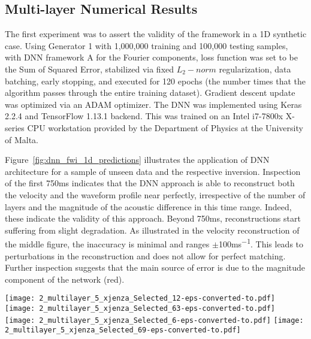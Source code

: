 \clearpage
\subsection{Multi-layer Numerical Results}\label{sec:results_Multi-layer_1D_Numerical_Results}
The first experiment was to assert the validity of the framework in a 1D synthetic case. Using Generator 1 with 1,000,000 training and 100,000 testing samples, with DNN framework A for the Fourier components, loss function was set to be the Sum of Squared Error, stabilized via fixed $L_2-norm$ regularization, data batching, early stopping, and executed for 120 epochs (the number times that the algorithm passes through the entire training dataset). Gradient descent update was optimized via an ADAM optimizer. The DNN was implemented using Keras 2.2.4 and TensorFlow 1.13.1 backend. This was trained on an Intel i7-7800x X-series CPU workstation provided by the Department of Physics at the University of Malta.

Figure~\ref{fig:dnn_fwi_1d_predictions} illustrates the application of DNN architecture for a sample of unseen data and the respective inversion. Inspection of the first 750\si{ms} indicates that the DNN approach is able to reconstruct both the velocity and the waveform profile near perfectly, irrespective of the number of layers and the magnitude of the acoustic difference in this time range. Indeed, these indicate the validity of this approach. Beyond 750\si{ms}, reconstructions start suffering from slight degradation. As illustrated in the velocity reconstruction of the middle figure, the inaccuracy is minimal and ranges $\pm$100\si{ms^{-1}}. This leads to perturbations in the reconstruction and does not allow for perfect matching. Further inspection suggests that the main source of error is due to the magnitude component of the network (red). 

\begin{figure*}[ht!]
	\centering
	\texttt{[image: 2\_multilayer\_5\_xjenza\_Selected\_12-eps-converted-to.pdf]}
	\texttt{[image: 2\_multilayer\_5\_xjenza\_Selected\_63-eps-converted-to.pdf]}
	\texttt{[image: 2\_multilayer\_5\_xjenza\_Selected\_6-eps-converted-to.pdf]}
	\texttt{[image: 2\_multilayer\_5\_xjenza\_Selected\_69-eps-converted-to.pdf]}
	\caption[DNN predictions]{Four different predictions obtained from learned weights of the DNN on unseen data. The top panels are the velocity profile reconstructions from the two NN architecture branches ($\mathcal{M}(\zeta)$ and $\mathcal{M}(\phi)$) and the combined result. Bottom panels are the observed and inverted waveforms.}
	\label{fig:dnn_fwi_1d_predictions}
\end{figure*}

